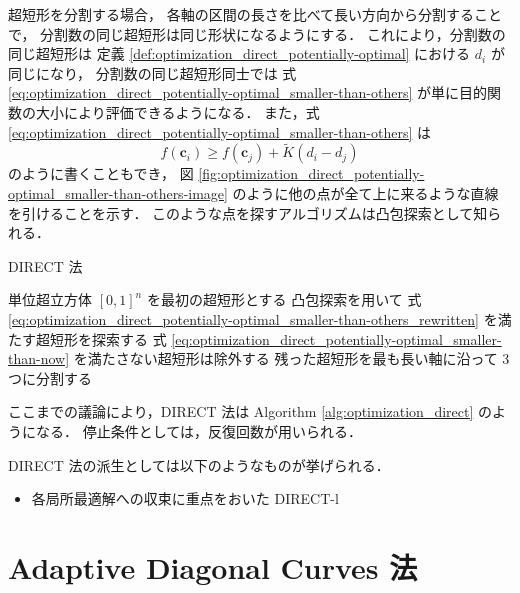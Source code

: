超短形を分割する場合，
各軸の区間の長さを比べて長い方向から分割することで，
分割数の同じ超短形は同じ形状になるようにする．
これにより，分割数の同じ超短形は
定義 \ref{def:optimization_direct_potentially-optimal} における $d_i$ が同じになり，
分割数の同じ超短形同士では
式 \eqref{eq:optimization_direct_potentially-optimal_smaller-than-others}
が単に目的関数の大小により評価できるようになる．
また，式 \eqref{eq:optimization_direct_potentially-optimal_smaller-than-others} は
\begin{equation}
    f(\bm{c}_i) \ge f(\bm{c}_j) + \tilde{K} (d_i - d_j)
    \label{eq:optimization_direct_potentially-optimal_smaller-than-others_rewritten}
\end{equation}
のように書くこともでき，
図 \ref{fig:optimization_direct_potentially-optimal_smaller-than-others-image}
のように他の点が全て上に来るような直線を引けることを示す．
このような点を探すアルゴリズムは凸包探索として知られる．

\begin{algorithm}[tp]
    \caption{DIRECT 法}
    \label{alg:optimization_direct}
    \begin{algorithmic}
        \State 単位超立方体 $[0, 1]^n$ を最初の超短形とする
        \Loop
        \State 凸包探索を用いて
        式 \eqref{eq:optimization_direct_potentially-optimal_smaller-than-others_rewritten}
        を満たす超短形を探索する
        \State 式 \eqref{eq:optimization_direct_potentially-optimal_smaller-than-now}
        を満たさない超短形は除外する
        \State 残った超短形を最も長い軸に沿って 3 つに分割する
        \State \Return
        \EndIf
        \EndLoop
        \EndProcedure
    \end{algorithmic}
\end{algorithm}

ここまでの議論により，DIRECT 法は
Algorithm \ref{alg:optimization_direct} のようになる．
停止条件としては，反復回数が用いられる．

DIRECT 法の派生としては以下のようなものが挙げられる．

\begin{itemize}
    \item 各局所最適解への収束に重点をおいた DIRECT-l \cite{Gablonsky2001}
\end{itemize}

\section{Adaptive Diagonal Curves 法}

